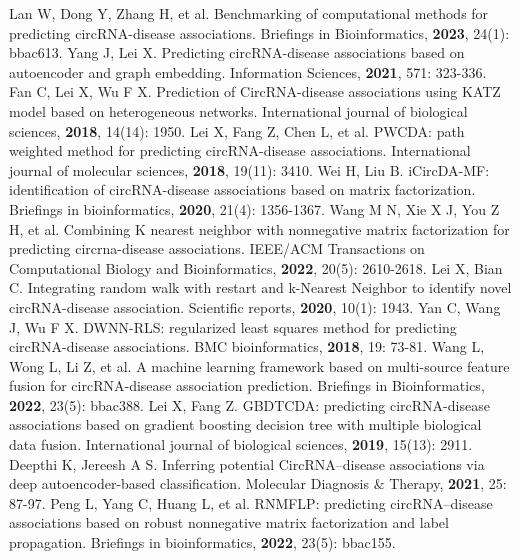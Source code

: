 \documentclass[journal=jcisd8,manuscript=article]{achemso}
\begin{document}
\begin{thebibliography}{}
Lan W, Dong Y, Zhang H, et al. Benchmarking of computational methods for predicting circRNA-disease associations. Briefings in Bioinformatics, \textbf{2023}, 24(1): bbac613.
%
Yang J, Lei X. Predicting circRNA-disease associations based on autoencoder and graph embedding. Information Sciences, \textbf{2021}, 571: 323-336.
Fan C, Lei X, Wu F X. Prediction of CircRNA-disease associations using KATZ model based on heterogeneous networks. International journal of biological sciences, \textbf{2018}, 14(14): 1950.
Lei X, Fang Z, Chen L, et al. PWCDA: path weighted method for predicting circRNA-disease associations. International journal of molecular sciences, \textbf{2018}, 19(11): 3410.
Wei H, Liu B. iCircDA-MF: identification of circRNA-disease associations based on matrix factorization. Briefings in bioinformatics, \textbf{2020}, 21(4): 1356-1367.
Wang M N, Xie X J, You Z H, et al. Combining K nearest neighbor with nonnegative matrix factorization for predicting circrna-disease associations. IEEE/ACM Transactions on Computational Biology and Bioinformatics, \textbf{2022}, 20(5): 2610-2618.
%
Lei X, Bian C. Integrating random walk with restart and k-Nearest Neighbor to identify novel circRNA-disease association. Scientific reports, \textbf{2020}, 10(1): 1943.
Yan C, Wang J, Wu F X. DWNN-RLS: regularized least squares method for predicting circRNA-disease associations. BMC bioinformatics, \textbf{2018}, 19: 73-81.
Wang L, Wong L, Li Z, et al. A machine learning framework based on multi-source feature fusion for circRNA-disease association prediction. Briefings in Bioinformatics, \textbf{2022}, 23(5): bbac388.
Lei X, Fang Z. GBDTCDA: predicting circRNA-disease associations based on gradient boosting decision tree with multiple biological data fusion. International journal of biological sciences, \textbf{2019}, 15(13): 2911.
%
Deepthi K, Jereesh A S. Inferring potential CircRNA–disease associations via deep autoencoder-based classification. Molecular Diagnosis \& Therapy, \textbf{2021}, 25: 87-97.
Peng L, Yang C, Huang L, et al. RNMFLP: predicting circRNA–disease associations based on robust nonnegative matrix factorization and label propagation. Briefings in bioinformatics, \textbf{2022}, 23(5): bbac155.
%

\end{thebibliography}
\end{document}
